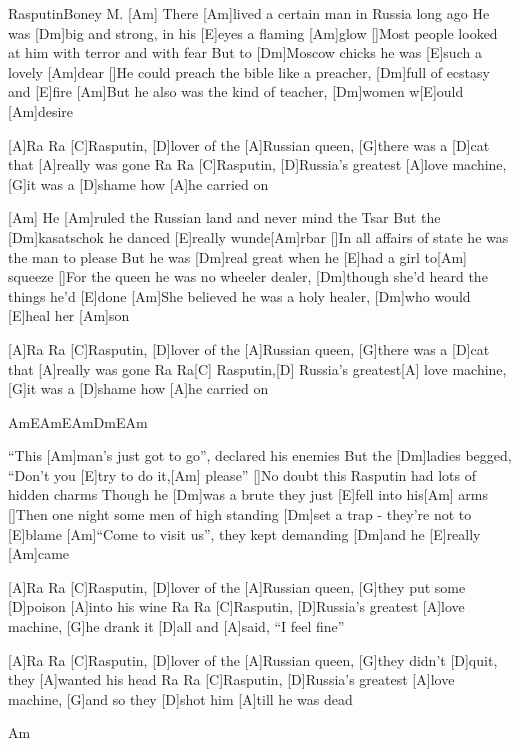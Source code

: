 \documentclass[../main.tex]{subfiles}
\begin{document}
\begin{song}[2]{Rasputin}{Boney M.}{}
[Am]\hh[E]\hh[Am]\hh[E]\hh
There [Am]lived a certain man in Russia long ago
He was [Dm]big and strong, in his [E]eyes a flaming [Am]glow
[]Most people looked at him with terror and with fear
But to [Dm]Moscow chicks he was [E]such a lovely [Am]dear
[]He could preach the bible like a preacher, [Dm]full of ecstasy and [E]fire
[Am]But he also was the kind of teacher, [Dm]women w[E]ould [Am]desire

[A]Ra Ra [C]Rasputin, [D]lover of the [A]Russian queen, [G]there was a [D]cat that [A]really was gone
Ra Ra [C]Rasputin, [D]Russia's greatest [A]love machine, [G]it was a [D]shame how [A]he carried on

[Am]\hh[E]\hh[Am]\hh[E]\hh[Am]\hh[Dm]\hh[E]\hh[Am]\hh
He [Am]ruled the Russian land and never mind the Tsar
But the [Dm]kasatschok he danced [E]really wunde[Am]rbar
[]In all affairs of state he was the man to please
But he was [Dm]real great when he [E]had a girl to[Am] squeeze
[]For the queen he was no wheeler dealer, [Dm]though she'd heard the things he'd [E]done
[Am]She believed he was a holy healer, [Dm]who would [E]heal her [Am]son

[A]Ra Ra [C]Rasputin, [D]lover of the [A]Russian queen, [G]there was a [D]cat that [A]really was gone
Ra Ra[C] Rasputin,[D] Russia's greatest[A] love machine, [G]it was a [D]shame how [A]he carried on


{\guitarPreAccord Am\hh E\hh Am\hh E\hh Am\hh Dm\hh E\hh Am\hh}

``This [Am]man's just got to go'', declared his enemies
But the [Dm]ladies begged, ``Don't you [E]try to do it,[Am] please''
[]No doubt this Rasputin had lots of hidden charms
Though he [Dm]was a brute they just [E]fell into his[Am] arms
[]Then one night some men of high standing [Dm]set a trap - they're not to [E]blame
[Am]``Come to visit us'', they kept demanding [Dm]and he [E]really [Am]came

[A]Ra Ra [C]Rasputin, [D]lover of the [A]Russian queen, [G]they put some [D]poison [A]into his wine
Ra Ra [C]Rasputin, [D]Russia's greatest [A]love machine, [G]he drank it [D]all and [A]said, ``I feel fine''

[A]Ra Ra [C]Rasputin, [D]lover of the [A]Russian queen, [G]they didn't [D]quit, they [A]wanted his head
Ra Ra [C]Rasputin, [D]Russia's greatest [A]love machine, [G]and so they [D]shot him [A]till he was dead

{\guitarPreAccord Am}
\end{song}
\end{document}
